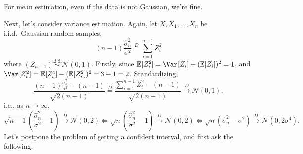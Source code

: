 \begin{remark}
	For mean estimation, even if the data is not Gaussian, we're fine.
\end{remark}

Next, let's consider variance estimation. Again, let \(X, X_1, \dots , X_n\) be i.i.d.\ Gaussian random samples,
\[
	(n-1) \frac{\hat{\sigma} _n^2}{\sigma ^2}
	\overset{D}{=} \sum_{i=1}^{n-1} Z_i^2
\]
where \((Z_{n-1}) \overset{\text{i.i.d.} }{\sim } \mathcal{N} (0, 1)\). Firstly, since \(\mathbb{E}_{}[Z_i^2] = \Var_{}[Z_i] + (\mathbb{E}_{}[Z_i] )^2 = 1\), and \(\Var_{}[Z_i^2] = \mathbb{E}_{}[Z_i^4] - (\mathbb{E}_{}[Z_i^2] )^2 = 3 - 1 = 2\). Standardizing,
\[
	\frac{(n-1) \frac{\hat{\sigma} _n^2}{\sigma ^2} - (n - 1)}{\sqrt{2 (n-1)} }
	\overset{D}{=} \frac{\sum_{i=1}^{n-1} Z_i^2 - (n-1)}{\sqrt{2 (n-1)} }
	\overset{D}{\to } \mathcal{N} (0, 1),
\]
i.e., as \(n \to \infty \),
\[
	\sqrt{n-1} \left( \frac{\hat{\sigma} _n^2}{\sigma ^2} - 1 \right)  \overset{D}{\to } \mathcal{N} (0, 2)
	\iff \sqrt{n} \left( \frac{\hat{\sigma} _n^2}{\sigma ^2} - 1 \right)  \overset{D}{\to } \mathcal{N} (0, 2)
	\iff \sqrt{n} (\hat{\sigma} _n^2 - \sigma ^2) \overset{D}{\to } \mathcal{N} (0, 2 \sigma ^4).
\]
Let's postpone the problem of getting a confident interval, and first ask the following.

